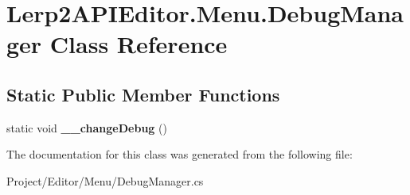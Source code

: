 \hypertarget{class_lerp2_a_p_i_editor_1_1_menu_1_1_debug_manager}{}\section{Lerp2\+A\+P\+I\+Editor.\+Menu.\+Debug\+Manager Class Reference}
\label{class_lerp2_a_p_i_editor_1_1_menu_1_1_debug_manager}
\subsection*{Static Public Member Functions}
\begin{DoxyCompactItemize}
\item 
\mbox{\label{class_lerp2_a_p_i_editor_1_1_menu_1_1_debug_manager_ab308987e82fc9423fd069cd5dfac0e7a}} 
static void {\bfseries \+\_\+\+\_\+change\+Debug} ()
\end{DoxyCompactItemize}


The documentation for this class was generated from the following file\+:\begin{DoxyCompactItemize}
\item 
Project/\+Editor/\+Menu/Debug\+Manager.\+cs\end{DoxyCompactItemize}
